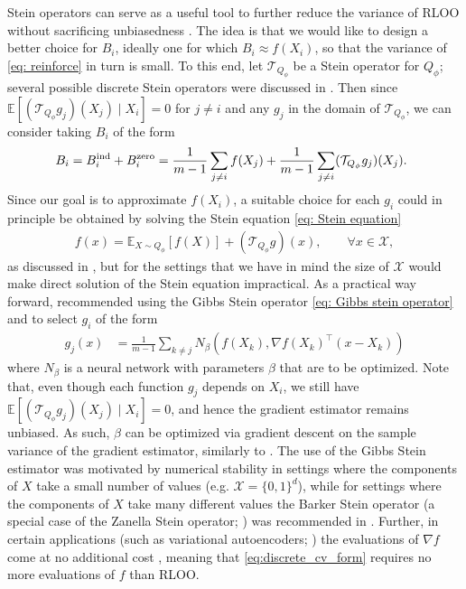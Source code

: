 \documentclass[12pt,paper=letter]{scrreprt}
\def\mbb#1{\mathbb{#1}}
\def\E{\mbb{E}} %
\begin{document}
Stein operators can serve as a useful tool to further reduce the variance of RLOO without sacrificing unbiasedness \citep{shi2022gradient}.
The idea is that we would like to design a better choice for $B_i$, ideally one for which $B_i \approx f(X_i)$, so that the variance of \eqref{eq: reinforce} in turn is small.
To this end, let $\mathcal{T}_{Q_\phi}$ be a Stein operator for $Q_\phi$; several possible discrete Stein operators were discussed in .
Then since $\E[(\mathcal{T}_{Q_\phi} g_j)(X_j)\mid X_i] = 0$ for $j\neq i$ and any $g_j$ in the domain of $\mathcal{T}_{Q_\phi}$, we can consider taking $B_i$ of the form
\begin{align}
\!\!\! B_i 
    =
B_i^{\textup{ind}} 
    +
B_i^{\textup{zero}}   
    =
\frac{1}{m-1}\sum_{j\neq i} f(X_j) + \frac{1}{m-1}\sum_{j\neq i} (\mathcal{T}_{Q_\phi} g_j)(X_j). \label{eq: rodeo b}
\end{align}
Since our goal is to approximate $f(X_i)$, 
a suitable choice for each $g_i$ could in principle be obtained by solving the Stein equation \eqref{eq: Stein equation}
\begin{align*}
    f(x) = \mathbb{E}_{X \sim Q_\phi}[f(X)] + (\mathcal{T}_{Q_\phi} g)(x) , \qquad \forall x \in \mathcal{X},
\end{align*}
as discussed in , but for the settings that we have in mind the size of $\mathcal{X}$ would make direct solution of the Stein equation impractical.
As a practical way forward, \citet{shi2022gradient} recommended using the Gibbs Stein operator \eqref{eq: Gibbs stein operator} and to select $g_i$ of the form 
\begin{align}\label{eq:discrete_cv_form}
g_j(x) & = \frac{1}{m - 1}\sum_{k\neq j} \! N_{\beta}( f(X_k), \nabla f(X_k)^\top (x - X_k))
\end{align} 
where $N_{\beta}$ is a neural network with parameters $\beta$ that are to be optimized. 
Note that, even though each function $g_j$ depends on $X_i$, we still have $\E[(\mathcal{T}_{Q_\phi} g_j)(X_j)\mid X_i] = 0$, and hence the gradient estimator remains unbiased. 
As such, $\beta$ can be optimized via gradient descent on the sample variance of the gradient estimator, similarly to \citet{grathwohl2017backpropagation}.
The use of the Gibbs Stein estimator was motivated by numerical stability in settings where the components of $X$ take a small number of values (e.g. $\mathcal{X} = \{0,1\}^d$), while for settings where the components of $X$ take many different values the Barker Stein operator (a special case of the Zanella Stein operator; ) was recommended in \citet{shi2022gradient}.
Further, in certain applications (such as variational autoencoders; ) the evaluations of $\nabla f$ come at no additional cost \citep{titsias2022double}, meaning that \eqref{eq:discrete_cv_form} requires no more evaluations of $f$ than RLOO.
\end{document}
